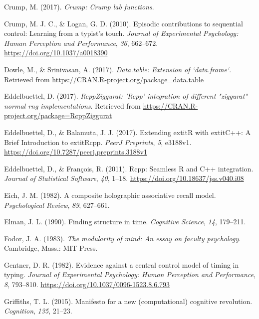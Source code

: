 \documentclass[,man,donotrepeattitle,floatsintext]{apa6}
\begin{document}
\leavevmode\hypertarget{ref-R-Crump}{}%
Crump, M. (2017). \emph{Crump: Crump lab functions}.

\leavevmode\hypertarget{ref-crump_episodic_2010}{}%
Crump, M. J. C., \& Logan, G. D. (2010). Episodic contributions to sequential control: Learning from a typist's touch. \emph{Journal of Experimental Psychology: Human Perception and Performance}, \emph{36}, 662--672. \url{https://doi.org/10.1037/a0018390}

\leavevmode\hypertarget{ref-R-data.table}{}%
Dowle, M., \& Srinivasan, A. (2017). \emph{Data.table: Extension of `data.frame`}. Retrieved from \url{https://CRAN.R-project.org/package=data.table}

\leavevmode\hypertarget{ref-R-RcppZiggurat}{}%
Eddelbuettel, D. (2017). \emph{RcppZiggurat: 'Rcpp' integration of different "ziggurat" normal rng implementations}. Retrieved from \url{https://CRAN.R-project.org/package=RcppZiggurat}

\leavevmode\hypertarget{ref-R-Rcpp_b}{}%
Eddelbuettel, D., \& Balamuta, J. J. (2017). Extending extitR with extitC++: A Brief Introduction to extitRcpp. \emph{PeerJ Preprints}, \emph{5}, e3188v1. \url{https://doi.org/10.7287/peerj.preprints.3188v1}

\leavevmode\hypertarget{ref-R-Rcpp_a}{}%
Eddelbuettel, D., \& François, R. (2011). Rcpp: Seamless R and C++ integration. \emph{Journal of Statistical Software}, \emph{40}, 1--18. \url{https://doi.org/10.18637/jss.v040.i08}

\leavevmode\hypertarget{ref-eich_composite_1982}{}%
Eich, J. M. (1982). A composite holographic associative recall model. \emph{Psychological Review}, \emph{89}, 627--661.

\leavevmode\hypertarget{ref-elman_finding_1990}{}%
Elman, J. L. (1990). Finding structure in time. \emph{Cognitive Science}, \emph{14}, 179--211.

\leavevmode\hypertarget{ref-fodor_modularity_1983}{}%
Fodor, J. A. (1983). \emph{The modularity of mind: An essay on faculty psychology}. Cambridge, Mass.: MIT Press.

\leavevmode\hypertarget{ref-GentnerEvidencecentralcontrol1982}{}%
Gentner, D. R. (1982). Evidence against a central control model of timing in typing. \emph{Journal of Experimental Psychology: Human Perception and Performance}, \emph{8}, 793--810. \url{https://doi.org/10.1037/0096-1523.8.6.793}

\leavevmode\hypertarget{ref-griffiths_manifesto_2015}{}%
Griffiths, T. L. (2015). Manifesto for a new (computational) cognitive revolution. \emph{Cognition}, \emph{135}, 21--23.
\end{document}
